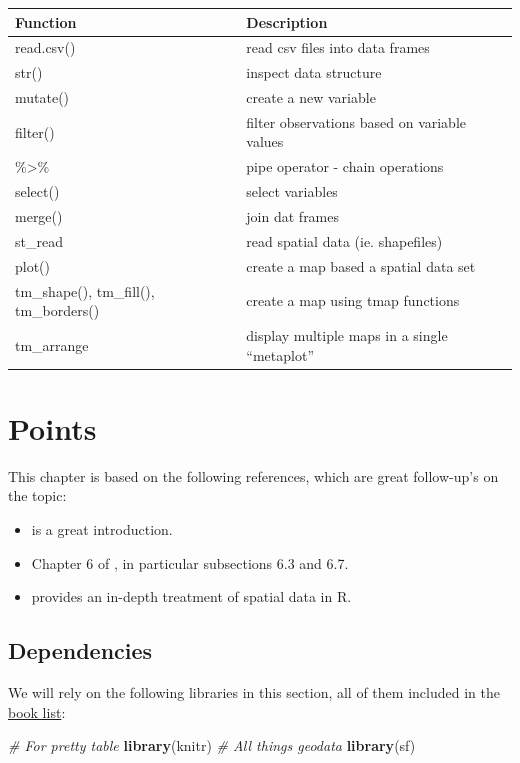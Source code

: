 \documentclass[
]{book}
\newenvironment{Shaded}{\begin{snugshade}}{\end{snugshade}}
\newcommand{\CommentTok}[1]{\textcolor[rgb]{0.56,0.35,0.01}{\textit{#1}}}
\newcommand{\KeywordTok}[1]{\textcolor[rgb]{0.13,0.29,0.53}{\textbf{#1}}}
\newcommand{\NormalTok}[1]{#1}
\providecommand{\tightlist}{%
  \setlength{\itemsep}{0pt}\setlength{\parskip}{0pt}}
\begin{document}
\begin{longtable}[]{@{}ll@{}}
\toprule
Function & Description\tabularnewline
\midrule
\endhead
read.csv() & read csv files into data frames\tabularnewline
str() & inspect data structure\tabularnewline
mutate() & create a new variable\tabularnewline
filter() & filter observations based on variable values\tabularnewline
\%\textgreater\% & pipe operator - chain operations\tabularnewline
select() & select variables\tabularnewline
merge() & join dat frames\tabularnewline
st\_read & read spatial data (ie. shapefiles)\tabularnewline
plot() & create a map based a spatial data set\tabularnewline
tm\_shape(), tm\_fill(), tm\_borders() & create a map using tmap functions\tabularnewline
tm\_arrange & display multiple maps in a single ``metaplot''\tabularnewline
\bottomrule
\end{longtable}

\hypertarget{points}{%
\chapter{Points}\label{points}}

This chapter is based on the following references, which are great follow-up's on the topic:

\begin{itemize}
\tightlist
\item
  \citet{lovelace2014introduction} is a great introduction.
\item
  Chapter 6 of \citet{comber2015}, in particular subsections 6.3 and 6.7.
\item
  \citet{bivand2013applied} provides an in-depth treatment of spatial data in R.
\end{itemize}

\hypertarget{dependencies-1}{%
\section{Dependencies}\label{dependencies-1}}

We will rely on the following libraries in this section, all of them included in the \protect\hyperlink{Dependency-list}{book list}:

\begin{Shaded}
\begin{Highlighting}[]
\CommentTok{# For pretty table}
\KeywordTok{library}\NormalTok{(knitr)}
\CommentTok{# All things geodata}
\KeywordTok{library}\NormalTok{(sf)}
\end{Highlighting}
\end{Shaded}
\end{document}
